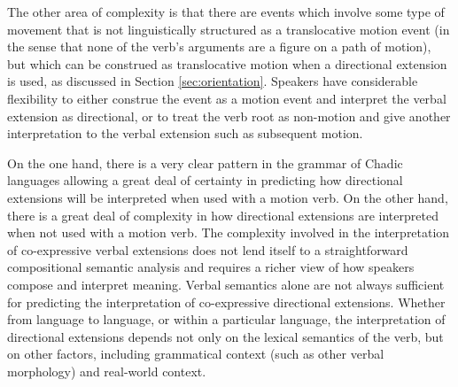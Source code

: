 The other area of complexity is that there are events which involve some type of movement that is not linguistically structured as a translocative motion event (in the sense that none of the verb's arguments are a figure on a path of motion), but which can be construed as translocative motion when a directional extension is used, as discussed in Section \ref{sec:orientation}. Speakers have considerable flexibility to either construe the event as a motion event and interpret the verbal extension as directional, or to treat the verb root as non-motion and give another interpretation to the verbal extension such as subsequent motion. 

On the one hand, there is a very clear pattern in the grammar of Chadic languages allowing a great deal of certainty in predicting how directional extensions will be interpreted when used with a motion verb. On the other hand, there is a great deal of complexity in how directional extensions are interpreted when not used with a motion verb. The complexity involved in the interpretation of co-expressive verbal extensions does not lend itself to a straightforward compositional semantic analysis and requires a richer view of how speakers compose and interpret meaning. Verbal semantics alone are not always sufficient for predicting the interpretation of co-expressive directional extensions. Whether from language to language, or within a particular language, the interpretation of directional extensions depends not only on the lexical semantics of the verb, but on other factors, including grammatical context (such as other verbal morphology) and real-world context.

